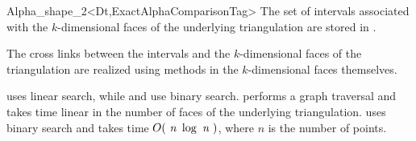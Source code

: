 \begin{ccRefClass} {Alpha_shape_2<Dt,ExactAlphaComparisonTag>}
\ccImplementation
The set of intervals associated with the
$k$-dimensional faces of the underlying triangulation are
stored in .

The cross links between the intervals and the $k$-dimensional faces of the
triangulation are realized using methods in the $k$-dimensional faces
themselves.

 uses linear search, while 
 and  
use binary search.
 performs a graph traversal and takes time
linear in the number of faces of the underlying triangulation.
 uses binary search and takes time
$O(\mbox{ \em n } \log{\mbox{ \em n } })$, where  $n$ is the number of points.

\end{ccRefClass}

